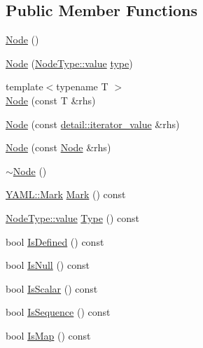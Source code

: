 \subsection*{Public Member Functions}
\begin{DoxyCompactItemize}
\item 
\mbox{\hyperlink{class_y_a_m_l_1_1_node_a19cb097351fff40c54c7837d1f84409e}{Node}} ()
\item 
\mbox{\hyperlink{class_y_a_m_l_1_1_node_a4401629dc793878b3527637ed1cc8485}{Node}} (\mbox{\hyperlink{struct_y_a_m_l_1_1_node_type_af83cf3f3c2eca0bf0eae1bbf981e86c4}{Node\+Type\+::value}} \mbox{\hyperlink{glad_8h_a890efa53b3d7deeeced6f3a0d6653ed3}{type}})
\item 
{\footnotesize template$<$typename T $>$ }\\\mbox{\hyperlink{class_y_a_m_l_1_1_node_a8ca3b8da61f7f85a7a3424893951bb1c}{Node}} (const T \&rhs)
\item 
\mbox{\hyperlink{class_y_a_m_l_1_1_node_a73644c0a70230a2400636e4bc0e1f061}{Node}} (const \mbox{\hyperlink{struct_y_a_m_l_1_1detail_1_1iterator__value}{detail\+::iterator\+\_\+value}} \&rhs)
\item 
\mbox{\hyperlink{class_y_a_m_l_1_1_node_af6e3fe8af7e9da72d9c6484b0370d533}{Node}} (const \mbox{\hyperlink{class_y_a_m_l_1_1_node}{Node}} \&rhs)
\item 
\mbox{\hyperlink{class_y_a_m_l_1_1_node_a29d21a7eceac20e93028810d2c313a06}{$\sim$\+Node}} ()
\item 
\mbox{\hyperlink{struct_y_a_m_l_1_1_mark}{Y\+A\+M\+L\+::\+Mark}} \mbox{\hyperlink{class_y_a_m_l_1_1_node_ade805ae8e338c7026add709e8d6c3f24}{Mark}} () const
\item 
\mbox{\hyperlink{struct_y_a_m_l_1_1_node_type_af83cf3f3c2eca0bf0eae1bbf981e86c4}{Node\+Type\+::value}} \mbox{\hyperlink{class_y_a_m_l_1_1_node_a03ec765b519b11c1bdf9c050298a966d}{Type}} () const
\item 
bool \mbox{\hyperlink{class_y_a_m_l_1_1_node_a45f02d95f0dbbd223c36045769787897}{Is\+Defined}} () const
\item 
bool \mbox{\hyperlink{class_y_a_m_l_1_1_node_ae46fcc36b16c65a3ff39215bf02ca985}{Is\+Null}} () const
\item 
bool \mbox{\hyperlink{class_y_a_m_l_1_1_node_a66c9a35b6c47e18d5df75e946cf2acf5}{Is\+Scalar}} () const
\item 
bool \mbox{\hyperlink{class_y_a_m_l_1_1_node_ad550e0b444c8a2c3b9cc6342a87a2118}{Is\+Sequence}} () const
\item 
bool \mbox{\hyperlink{class_y_a_m_l_1_1_node_aab7e81b22940b960c141fc57f04b7d8a}{Is\+Map}} () const

\end{DoxyCompactItemize}
